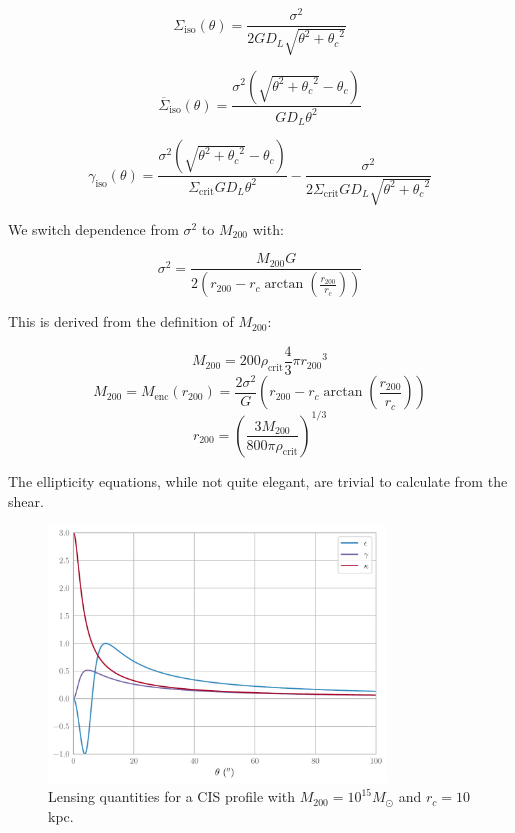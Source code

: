 \documentclass[10pt]{article}
\begin{document}
\begin{equation}
\Sigma_\mathrm{iso}(\theta) = \frac{\sigma^2}{2 G D_L \sqrt{\theta^2 + {\theta_c}^2}}
\end{equation}

\begin{equation}
\overline{\Sigma}_\mathrm{iso}(\theta) = \frac{\sigma^2 \left(\sqrt{\theta^2 + {\theta_c}^2} - \theta_c \right)}{G D_L \theta^2}
\end{equation}

\begin{equation}
\gamma_\mathrm{iso}(\theta) = \frac{\sigma^2 \left(\sqrt{\theta^2 + {\theta_c}^2} - \theta_c \right)}{\Sigma_\mathrm{crit} G D_L \theta^2} - \frac{\sigma^2}{2 \Sigma_\mathrm{crit} G D_L \sqrt{\theta^2 + {\theta_c}^2}}
\end{equation}

We switch dependence from $\sigma^2$ to $M_{200}$ with:

\begin{equation}
\sigma^2 = \frac{M_{200} G}{2 \left( r_{200} - r_c \arctan{\left(\frac{r_{200}}{r_c}\right)} \right)}
\end{equation}

This is derived from the definition of $M_{200}$:

\begin{equation}
M_{200} = 200 \rho_\mathrm{crit} \frac{4}{3} \pi {r_{200}}^3
\end{equation}
\begin{equation}
M_{200} = M_\mathrm{enc}(r_{200}) = \frac{2 \sigma^2}{G} \left( r_{200} - r_c \arctan{\left(\frac{r_{200}}{r_c}\right)} \right)
\end{equation}
\begin{equation}
r_{200} = \left( \frac{3 M_{200}}{800 \pi \rho_\mathrm{crit}} \right)^{1/3}
\end{equation}

The ellipticity equations, while not quite elegant, are trivial to calculate from the shear.

\begin{figure}
    \centering
    \includegraphics[width=0.8\textwidth]{isothermalproperties.pdf}
    \caption{Lensing quantities for a CIS profile with $M_{200} = 10^{15} M_\odot$ and $r_c = 10$ kpc.}
    \label{}
\end{figure}
\end{document}

